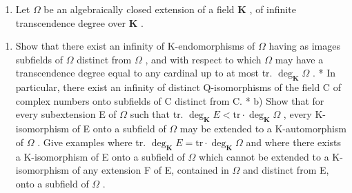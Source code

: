 \begin{enumerate}
\def\labelenumi{\arabic{enumi})}
\setcounter{enumi}{3}
\tightlist
\item
  Let \(\Omega\) be an algebraically closed extension of a field \(\mathbf{K}\) , of infinite transcendence degree over \(\mathbf{K}\) .
\end{enumerate}

\begin{enumerate}
\def\labelenumi{\alph{enumi})}
\tightlist
\item
  Show that there exist an infinity of K-endomorphisms of \(\Omega\) having as images subfields of \(\Omega\) distinct from \(\Omega\) , and with respect to which \(\Omega\) may have a transcendence degree equal to any cardinal up to at most tr. \(\deg_{\mathbf{K}}\Omega\) . * In particular, there exist an infinity of distinct Q-isomorphisms of the field C of complex numbers onto subfields of C distinct from C. * b) Show that for every subextension E of \(\Omega\) such that tr. \(\deg_{\mathbf{K}}E < \text{tr} \cdot \deg_{\mathbf{K}}\Omega\) , every K-isomorphism of E onto a subfield of \(\Omega\) may be extended to a K-automorphism of \(\Omega\) . Give examples where tr. \(\deg_{\mathbf{K}}E = \text{tr} \cdot \deg_{\mathbf{K}}\Omega\) and where there exists a K-isomorphism of E onto a subfield of \(\Omega\) which cannot be extended to a K-isomorphism of any extension F of E, contained in \(\Omega\) and distinct from E, onto a subfield of \(\Omega\) .
\end{enumerate}

